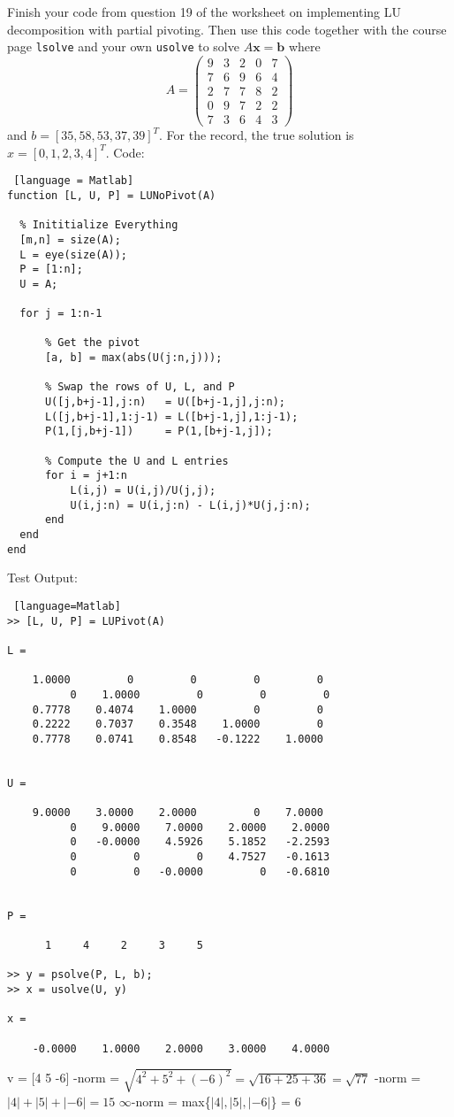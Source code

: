 \documentclass[12pt]{article}
\makeatletter
\theoremstyle{homework}
\newenvironment{exercise}[1]
{\def\@currentlabel{#1}\exercisecore}
{\endexercisecore}
\makeatother
\begin{document}
\begin{exercise}{Supplemental 1}
Finish your code from question 19 of the worksheet on implementing
LU decomposition with partial pivoting.  Then use this code together
with the course page \texttt{lsolve} and your own \texttt{usolve}
to solve $A\mathbf{x}=\mathbf{b}$ where
\[
A=\begin{pmatrix} 9 & 3 & 2 & 0 &7 \\
7 & 6 & 9 & 6 & 4\\
2 & 7 & 7 & 8 & 2 \\
0 & 9 & 7 & 2 & 2 \\
7 & 3 & 6 & 4 & 3
\end{pmatrix}
\]
and $b=[35,58,53,37,39]^T$.  For the record, the true solution is $x=[0,1,2,3,4]^T$.
\end{exercise}
Code:
\begin{lstlisting} [language = Matlab]
function [L, U, P] = LUNoPivot(A)
    
  % Inititialize Everything
  [m,n] = size(A);
  L = eye(size(A));
  P = [1:n];
  U = A;
  
  for j = 1:n-1
      
      % Get the pivot
      [a, b] = max(abs(U(j:n,j)));
      
      % Swap the rows of U, L, and P
      U([j,b+j-1],j:n)   = U([b+j-1,j],j:n);
      L([j,b+j-1],1:j-1) = L([b+j-1,j],1:j-1);
      P(1,[j,b+j-1])     = P(1,[b+j-1,j]);

      % Compute the U and L entries
      for i = j+1:n
          L(i,j) = U(i,j)/U(j,j);
          U(i,j:n) = U(i,j:n) - L(i,j)*U(j,j:n);
      end
  end
end
\end{lstlisting}
Test Output:
\begin{lstlisting} [language=Matlab]
>> [L, U, P] = LUPivot(A)

L =

    1.0000         0         0         0         0
          0    1.0000         0         0         0
    0.7778    0.4074    1.0000         0         0
    0.2222    0.7037    0.3548    1.0000         0
    0.7778    0.0741    0.8548   -0.1222    1.0000


U =

    9.0000    3.0000    2.0000         0    7.0000
          0    9.0000    7.0000    2.0000    2.0000
          0   -0.0000    4.5926    5.1852   -2.2593
          0         0         0    4.7527   -0.1613
          0         0   -0.0000         0   -0.6810


P =

      1     4     2     3     5

>> y = psolve(P, L, b);
>> x = usolve(U, y)

x =

    -0.0000    1.0000    2.0000    3.0000    4.0000
\end{lstlisting}

\begin{exercise}{Exercise 7.8}
\end{exercise}
v = [4 5 -6]
-norm = $\sqrt{4^2+5^2+(-6)^2} = \sqrt{16+25+36} = \sqrt{77}$
-norm = $|4|+|5|+|-6| = 15$
\newline
$\infty$-norm = max\{$|4|, |5|, |-6|$\} = 6
\end{document}
